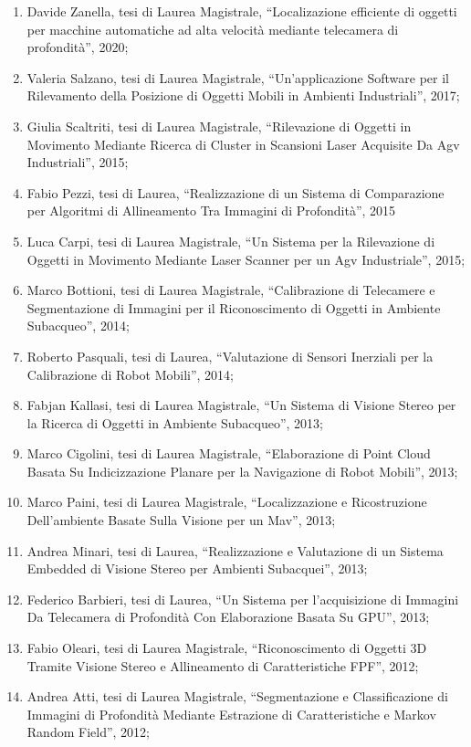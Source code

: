 \documentclass[11pt]{article}
\begin{document}
\begin{enumerate}
\item Davide Zanella, tesi di Laurea Magistrale, ``Localizazione efficiente di oggetti per macchine automatiche ad alta velocit\`a mediante telecamera di profondit\`a'', 2020;
\item Valeria Salzano, tesi di Laurea Magistrale, ``Un'applicazione Software per il Rilevamento della Posizione di Oggetti Mobili  in Ambienti Industriali'', 2017;
%
\item Giulia Scaltriti, tesi di Laurea Magistrale, ``Rilevazione di Oggetti  in Movimento Mediante Ricerca di Cluster  in Scansioni Laser Acquisite Da Agv Industriali'', 2015;
\item Fabio Pezzi, tesi di Laurea, ``Realizzazione di un Sistema di Comparazione per Algoritmi di Allineamento Tra Immagini di Profondit\`a'', 2015
\item Luca Carpi, tesi di Laurea Magistrale, ``Un Sistema per la Rilevazione di Oggetti in Movimento Mediante Laser Scanner per un Agv Industriale'', 2015;
%
\item Marco Bottioni, tesi di Laurea Magistrale, ``Calibrazione di Telecamere e Segmentazione di Immagini per il Riconoscimento di Oggetti in Ambiente Subacqueo'', 2014;
\item Roberto Pasquali, tesi di Laurea, ``Valutazione di Sensori Inerziali per la Calibrazione di Robot Mobili'', 2014;
%
\item Fabjan Kallasi,  tesi di Laurea Magistrale, ``Un Sistema di Visione Stereo per la Ricerca di Oggetti in Ambiente Subacqueo'', 2013;
\item Marco Cigolini, tesi di Laurea Magistrale, ``Elaborazione di Point Cloud Basata Su Indicizzazione Planare per la Navigazione di Robot Mobili'', 2013;
\item Marco Paini, tesi di Laurea Magistrale, ``Localizzazione e Ricostruzione Dell'ambiente Basate Sulla Visione per un Mav'', 2013;
\item Andrea Minari, tesi di Laurea, ``Realizzazione e Valutazione di un Sistema Embedded di Visione Stereo per Ambienti Subacquei'', 2013;
\item Federico Barbieri, tesi di Laurea, ``Un Sistema per l'acquisizione di Immagini Da Telecamera di Profondit\`a Con Elaborazione Basata Su GPU'', 2013;
%
\item Fabio Oleari, tesi di Laurea Magistrale, ``Riconoscimento di Oggetti 3D Tramite Visione Stereo e Allineamento di Caratteristiche FPF'', 2012;
\item Andrea Atti, tesi di Laurea Magistrale, ``Segmentazione e Classificazione di Immagini di Profondit\`a Mediante Estrazione di Caratteristiche e Markov Random Field'', 2012;

\end{enumerate}
\end{document}
